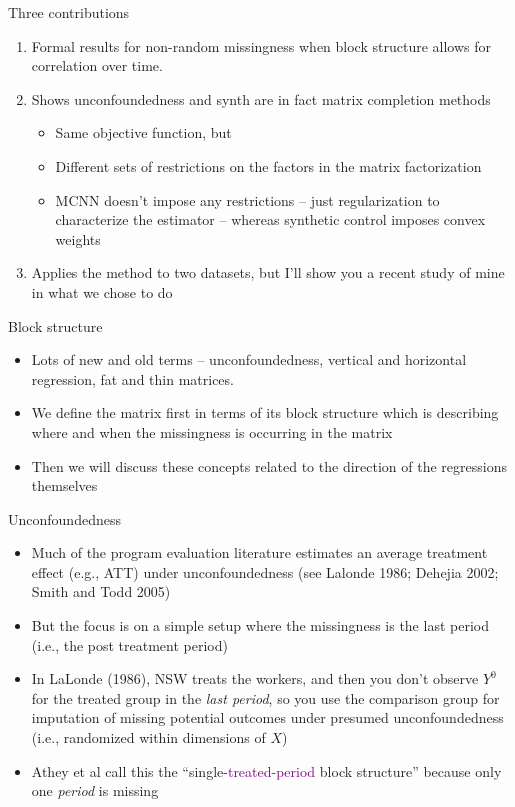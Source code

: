 \documentclass{beamer}
\begin{document}
\begin{frame}{Three contributions}

\begin{enumerate}
\item Formal results for non-random missingness when block structure allows for correlation over time. 
\item Shows unconfoundedness and synth are in fact matrix completion methods 
	\begin{itemize} 
	\item Same objective function, but
	\item Different sets of restrictions on the factors in the matrix factorization
	\item MCNN doesn't impose any restrictions -- just regularization to characterize the estimator -- whereas synthetic control imposes convex weights
	\end{itemize}
\item Applies the method to two datasets, but I'll show you a recent study of mine in what we chose to do
\end{enumerate}

\end{frame}


\begin{frame}{Block structure}

\begin{itemize}
\item Lots of new and old terms -- unconfoundedness, vertical and horizontal regression, fat and thin matrices.  
\item We define the matrix first in terms of its block structure which is describing where and when the missingness is occurring in the matrix
\item Then we will discuss these concepts related to the direction of the regressions themselves
\end{itemize}

\end{frame}

\begin{frame}{Unconfoundedness}

\begin{itemize}
\item Much of the program evaluation literature estimates an average treatment effect (e.g., ATT) under unconfoundedness (see Lalonde 1986; Dehejia 2002; Smith and Todd 2005)
\item But the focus is on a simple setup where the missingness is the last period (i.e., the post treatment period)
\item In LaLonde (1986), NSW treats the workers, and then you don't observe $Y^0$ for the treated group in the \emph{last period}, so you use the comparison group for imputation of missing potential outcomes under presumed unconfoundedness (i.e., randomized within dimensions of $X$)
\item Athey et al call this the ``single-\textcolor{purple}{treated-period} block structure'' because only one \emph{period} is missing
\end{itemize}

\end{frame}
\end{document}
